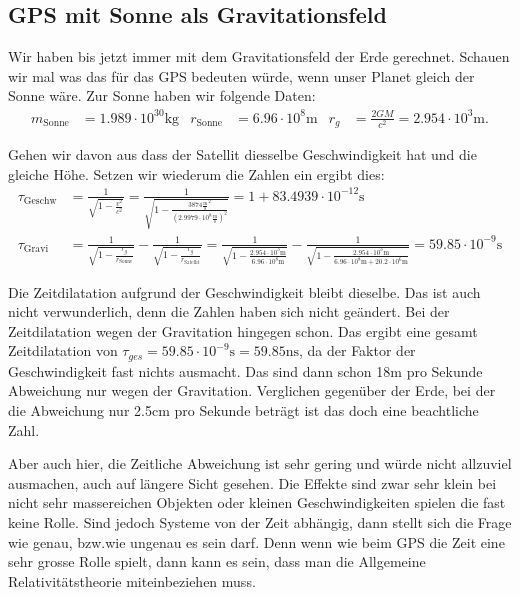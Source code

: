 \begin{refsection}
\subsection{GPS mit Sonne als Gravitationsfeld}
Wir haben bis jetzt immer mit dem Gravitationsfeld der Erde gerechnet. Schauen wir mal was das für das GPS bedeuten würde, wenn unser Planet gleich der Sonne wäre. Zur Sonne haben wir folgende Daten:
\begin{align*}
m_{\text{Sonne}} &= 1.989 \cdot 10^30\text{kg} & r_{\text{Sonne}} &= 6.96 \cdot 10^8\text{m} & r_g &= \frac{2GM}{c^2} = 2.954 \cdot 10^3\text{m}. 
\end{align*}

\noindent{}Gehen wir davon aus dass der Satellit diesselbe Geschwindigkeit hat und die gleiche Höhe. Setzen wir wiederum die Zahlen ein ergibt dies:
\begin{align*}
\tau_{\text{Geschw}} &= \frac{1}{\sqrt{1 - \frac{v^2}{c^2}}} = \frac{1}{\sqrt{1 - \frac{3874 \frac{\text{m}}{\text{s}}^2}{(2.9979 \cdot 10^8 \frac{\text{m}}{\text{s}} )^2}}} = 1 + 83.4939 \cdot 10^{-12}\text{s}
\\
\tau_{\text{Gravi}} &= \frac{1}{\sqrt{1-\frac{r_g}{r_{\text{Sonne}}}}} - \frac{1}{\sqrt{1-\frac{r_g}{r_{\text{Satellit}}}}} =  
\frac{1}{\sqrt{1-\frac{2.954 \cdot 10^3\text{m}}{6.96 \cdot 10^8\text{m}}}} - \frac{1}{\sqrt{1-\frac{2.954 \cdot 10^3\text{m}}{ 6.96 \cdot 10^8\text{m} + 20.2 \cdot 10^6\text{m}}}} = 59.85 \cdot 10^{-9}\text{s}
\end{align*}

\noindent{}Die Zeitdilatation aufgrund der Geschwindigkeit bleibt dieselbe. Das ist auch nicht verwunderlich, denn die Zahlen haben sich nicht geändert. Bei der Zeitdilatation wegen der Gravitation hingegen schon. Das ergibt eine gesamt Zeitdilatation von \( \tau_{ges} = 59.85 \cdot 10^{-9}\text{s} = 59.85\text{ns} \), da der Faktor der Geschwindigkeit fast nichts ausmacht. Das sind dann schon 18m pro Sekunde Abweichung nur wegen der Gravitation. Verglichen gegenüber der Erde, bei der die Abweichung nur 2.5cm pro Sekunde beträgt ist das doch eine beachtliche Zahl.

Aber auch hier, die Zeitliche Abweichung ist sehr gering und würde nicht allzuviel ausmachen, auch auf längere Sicht gesehen. Die Effekte sind zwar sehr klein bei nicht sehr massereichen Objekten oder kleinen Geschwindigkeiten spielen die fast keine Rolle. Sind jedoch Systeme von der Zeit abhängig, dann stellt sich die Frage wie genau, bzw.wie ungenau es sein darf. Denn wenn wie beim GPS die Zeit eine sehr grosse Rolle spielt, dann kann es sein, dass man die Allgemeine Relativitätstheorie miteinbeziehen muss.


\end{refsection}
